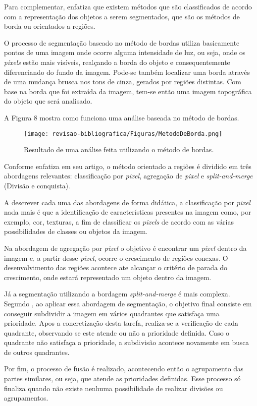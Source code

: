 Para complementar,  enfatiza que existem métodos que são classificados de acordo com a representação dos objetos a serem segmentados, que são os métodos de borda ou orientados a regiões.

O processo de segmentação baseado no método de bordas utiliza basicamente pontos de uma imagem onde ocorre alguma intensidade de luz, ou seja, onde os \textit{pixels} estão mais visíveis, realçando a borda do objeto e consequentemente diferenciando do fundo da imagem. Pode-se também localizar uma borda através de uma mudança brusca nos tons de cinza, gerados por regiões distintas. Com base na borda que foi extraída da imagem, tem-se então uma imagem topográfica do objeto que será analisado.

A Figura 8 mostra como funciona uma análise baseada no método de bordas.

\clearpage

\begin{figure}[!htb]
\caption{{\footnotesize Resultado de uma análise feita utilizando o método de bordas.}}
 
\centering %
\texttt{[image: revisao-bibliografica/Figuras/MetodoDeBorda.png]}%
\label{figura:figura6}

\centering {}
{
\label{figura:figura6}
}
\end{figure}

Conforme  enfatiza em seu artigo, o método orientado a regiões é dividido em três abordagens relevantes: classificação por \textit{pixel}, agregação de \textit{pixel} e \textit{split-and-merge} (Divisão e conquista).

A descrever cada uma das abordagens de forma didática, a classificação por \textit{pixel} nada mais é que a identificação de características presentes na imagem como, por exemplo, cor, texturas, a fim de classificar os \textit{pixels} de acordo com as várias possibilidades de classes ou objetos da imagem.

Na abordagem de agregação por \textit{pixel} o objetivo é encontrar um \textit{pixel} dentro da imagem e, a partir desse \textit{pixel}, ocorre o crescimento de regiões conexas. O desenvolvimento das regiões acontece ate alcançar o critério de parada do crescimento, onde estará representado um objeto dentro da imagem.

Já a segmentação utilizando a bordagem \textit{split-and-merge} é mais complexa. Segundo , ao aplicar essa abordagem de segmentação, o objetivo final consiste em conseguir subdividir a imagem em vários quadrantes que satisfaça uma prioridade. Apos a concretização desta tarefa, realiza-se a verificação de cada quadrante, observando se este atende ou não a prioridade definida. Caso o quadrante não satisfaça a prioridade, a subdivisão acontece novamente em busca de outros quadrantes.

Por fim, o processo de fusão é realizado, acontecendo então o agrupamento das partes similares, ou seja, que atende as prioridades definidas. Esse processo só finaliza quando não existe nenhuma possibilidade de realizar divisões ou agrupamentos.